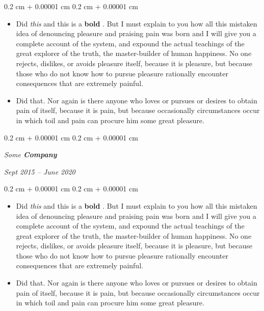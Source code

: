 \documentclass[10pt, letterpaper]{article}
\newenvironment{highlights}{
    \begin{itemize}[
        topsep=0.10 cm,
        parsep=0.10 cm,
        partopsep=0pt,
        itemsep=0pt,
        leftmargin=0.4 cm + 10pt
    ]
}{
    \end{itemize}
} %
\newenvironment{onecolentry}{
    \begin{adjustwidth}{
        0.2 cm + 0.00001 cm
    }{
        0.2 cm + 0.00001 cm
    }
}{
    \end{adjustwidth}
} %
\newenvironment{twocolentry}[2][]{
    \onecolentry
    \def\secondColumn{#2}
    \setcolumnwidth{\fill, 4.5 cm}
    \begin{paracol}{2}
}{
    \switchcolumn \raggedleft \secondColumn
    \end{paracol}
    \endonecolentry
} %
\let\hrefWithoutArrow\href
\renewcommand{\href}[2]{\hrefWithoutArrow{#1}{\ifthenelse{\equal{#2}{}}{ }{#2 }\raisebox{.15ex}{\footnotesize \faExternalLink*}}}
\begin{document}
        \vspace{0.10 cm}
        \begin{onecolentry}
            \begin{highlights}
                \item Did \textit{this} and this is a \textbf{bold} \href{https://example.com}{link}. But I must explain to you how all this mistaken idea of denouncing pleasure and praising pain was born and I will give you a complete account of the system, and expound the actual teachings of the great explorer of the truth, the master-builder of human happiness. No one rejects, dislikes, or avoids pleasure itself, because it is pleasure, but because those who do not know how to pursue pleasure rationally encounter consequences that are extremely painful.
                \item Did that. Nor again is there anyone who loves or pursues or desires to obtain pain of itself, because it is pain, but because occasionally circumstances occur in which toil and pain can procure him some great pleasure.
            \end{highlights}
        \end{onecolentry}


        \vspace{0.2 cm}

            \begin{twocolentry}{


        \textit{Sept 2015 – June 2020}    }
                \textbf{}

                \textit{Some \textbf{Company}}
            \end{twocolentry}

        \vspace{0.10 cm}
        \begin{onecolentry}
            \begin{highlights}
                \item Did \textit{this} and this is a \textbf{bold} \href{https://example.com}{link}. But I must explain to you how all this mistaken idea of denouncing pleasure and praising pain was born and I will give you a complete account of the system, and expound the actual teachings of the great explorer of the truth, the master-builder of human happiness. No one rejects, dislikes, or avoids pleasure itself, because it is pleasure, but because those who do not know how to pursue pleasure rationally encounter consequences that are extremely painful.
                \item Did that. Nor again is there anyone who loves or pursues or desires to obtain pain of itself, because it is pain, but because occasionally circumstances occur in which toil and pain can procure him some great pleasure.
            \end{highlights}
        \end{onecolentry}
\end{document}
